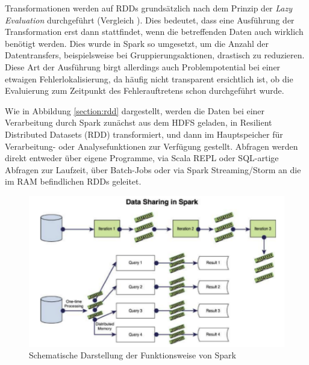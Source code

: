 Transformationen werden auf RDDs grundsätzlich nach dem Prinzip der \textit{Lazy Evaluation} durchgeführt  (Vergleich ). Dies bedeutet, dass eine Ausführung der Transformation erst dann stattfindet, wenn die betreffenden Daten auch wirklich benötigt werden. Dies wurde in Spark so umgesetzt, um die Anzahl der Datentransfers, beispielsweise bei Gruppierungsaktionen, drastisch zu reduzieren. Diese Art der Ausführung birgt allerdings auch Problempotential bei einer etwaigen Fehlerlokalisierung, da häufig nicht transparent ersichtlich ist, ob die Evaluierung zum Zeitpunkt des Fehlerauftretens schon durchgeführt wurde. 



Wie in Abbildung \ref{section:rdd} dargestellt, werden die Daten bei einer Verarbeitung durch Spark zunächst aus dem HDFS geladen, in Resilient Distributed Datasets (RDD) transformiert, und dann im Hauptspeicher für Verarbeitung- oder Analysefunktionen zur Verfügung gestellt. Abfragen werden direkt entweder über eigene Programme, via Scala REPL oder SQL-artige Abfragen zur Laufzeit, über Batch-Jobs oder via Spark Streaming/Storm an die im RAM befindlichen RDDs geleitet.

\begin{figure}[htb!]
\centering
\includegraphics[width=1.0\textwidth]{bilder/3_spark.png}
\caption{Schematische Darstellung der Funktionsweise von Spark \protect{}}
\label{fig:sparkfunkt}
\end{figure}

